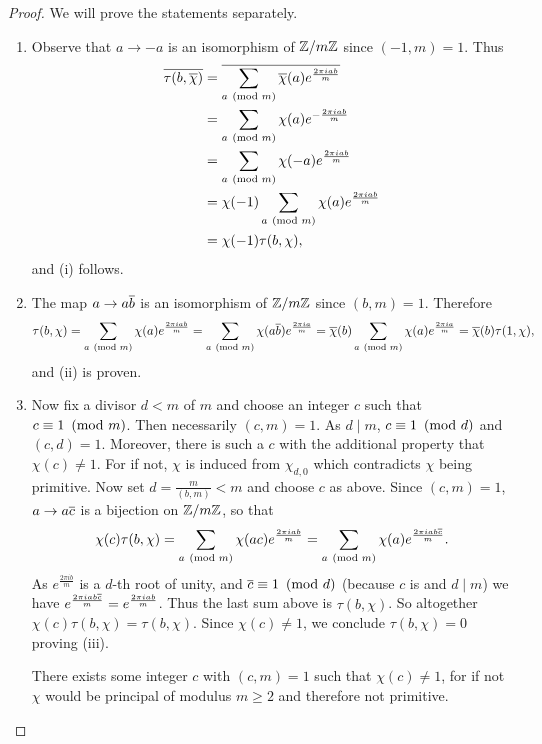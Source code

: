         \begin{proof}
          We will prove the statements separately.
          \begin{enumerate}[label=(\roman*)]
            \item Observe that $a \to -a$ is an isomorphism of $\mathbb{Z}/m\mathbb{Z}$ since $(-1,m) = 1$. Thus
            \begin{align*}
              \overline{\tau(b,\overline{\chi})} &= \overline{\sum_{a \ \left(\text{mod }m\right)}\overline{\chi}(a)e^{\frac{2\pi iab}{m}}} \\
              &= \sum_{a \ \left(\text{mod }m\right)}\chi(a)e^{-\frac{2\pi iab}{m}} \\
              &= \sum_{a \ \left(\text{mod }m\right)}\chi(-a)e^{\frac{2\pi iab}{m}} \\
              &= \chi(-1)\sum_{a \ \left(\text{mod }m\right)}\chi(a)e^{\frac{2\pi iab}{m}} \\
              &= \chi(-1)\tau(b,\chi),
            \end{align*}
            and (i) follows.
            \item The map $a \to a\overline{b}$ is an isomorphism of $\mathbb{Z}/m\mathbb{Z}$ since $(b,m) = 1$. Therefore
            \[
              \tau(b,\chi) = \sum_{a \ \left(\text{mod }m\right)}\chi(a)e^{\frac{2\pi iab}{m}} = \sum_{a \ \left(\text{mod }m\right)}\chi(a\overline{b})e^{\frac{2\pi ia}{m}} = \overline{\chi}(b)\sum_{a \ \left(\text{mod }m\right)}\chi(a)e^{\frac{2\pi ia}{m}} = \overline{\chi}(b)\tau(1,\chi),
            \]
            and (ii) is proven.
            \item Now fix a divisor $d < m$ of $m$ and choose an integer $c$ such that $c \equiv 1 \ \left(\text{mod }m\right)$. Then necessarily $(c,m) = 1$. As $d \mid m$, $c \equiv 1 \ \left(\text{mod }d\right)$ and $(c,d) = 1$. Moreover, there is such a $c$ with the additional property that $\chi(c) \neq 1$. For if not, $\chi$ is induced from $\chi_{d,0}$ which contradicts $\chi$ being primitive. Now set $d = \frac{m}{(b,m)} < m$ and choose $c$ as above. Since $(c,m) = 1$, $a \to a\overline{c}$ is a bijection on $\mathbb{Z}/m\mathbb{Z}$, so that
            \[
              \chi(c)\tau(b,\chi) = \sum_{a \ \left(\text{mod }m\right)}\chi(ac)e^{\frac{2\pi iab}{m}} = \sum_{a \ \left(\text{mod }m\right)}\chi(a)e^{\frac{2\pi iab\overline{c}}{m}}.
            \]
            As $e^{\frac{2\pi ib}{m}}$ is a $d$-th root of unity, and $\overline{c} \equiv 1 \ \left(\text{mod }d\right)$ (because $c$ is and $d \mid m$) we have $e^{\frac{2\pi iab\overline{c}}{m}} = e^{\frac{2\pi iab}{m}}$. Thus the last sum above is $\tau(b,\chi)$. So altogether $\chi(c)\tau(b,\chi) = \tau(b,\chi)$. Since $\chi(c) \neq 1$, we conclude $\tau(b,\chi) = 0$ proving (iii).

            There exists some integer $c$ with $(c,m) = 1$ such that $\chi(c) \neq 1$, for if not $\chi$ would be principal of modulus $m \ge 2$ and therefore not primitive.


\end{enumerate}
\end{proof}
